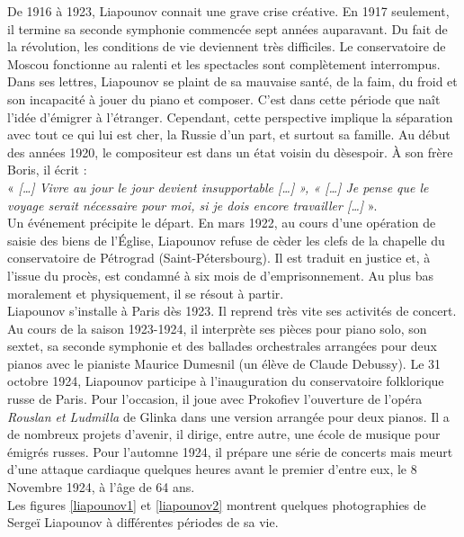 De 1916 à 1923, Liapounov connait une grave crise créative. En 1917 seulement, il termine sa seconde symphonie commencée sept années auparavant. Du fait de la révolution, les conditions de vie deviennent très difficiles. Le conservatoire de Moscou fonctionne au ralenti et les spectacles sont complètement interrompus. Dans ses lettres, Liapounov se plaint de sa mauvaise santé, de la faim, du froid et son incapacité à jouer du piano et composer. C'est dans cette période que naît l'idée d'émigrer à l'étranger. Cependant, cette perspective implique la séparation avec tout ce qui lui est cher, la Russie d'un part, et surtout sa famille. Au début des années 1920, le compositeur est dans un état voisin du dèsespoir. À son frère Boris, il écrit :\\
« \emph{[\dots] Vivre au jour le jour devient insupportable [\dots] », « [\dots] Je pense que le voyage serait nécessaire pour moi, si je dois encore travailler [\dots]} ».\\

Un événement précipite le départ. En mars 1922, au cours d'une opération de saisie des biens de l'Église, Liapounov refuse de cèder les clefs de la chapelle du conservatoire de Pétrograd (Saint-Pétersbourg). Il est traduit en justice et, à l'issue du procès, est condamné à six mois de d'emprisonnement. Au plus bas moralement et physiquement, il se résout à partir.\\

Liapounov s'installe à Paris dès 1923. Il reprend très vite ses activités de concert. Au cours de la saison 1923-1924, il interprète ses pièces pour piano solo, son sextet, sa seconde symphonie et des ballades orchestrales arrangées pour deux pianos avec le pianiste Maurice Dumesnil (un élève de Claude Debussy). Le 31 octobre 1924, Liapounov participe à l'inauguration du conservatoire folklorique russe de Paris. Pour l'occasion, il joue avec Prokofiev l'ouverture de l'opéra \emph{Rouslan et Ludmilla} de Glinka dans une version arrangée pour deux pianos. Il a de nombreux projets d'avenir, il dirige, entre autre, une école de musique pour émigrés russes. Pour l'automne 1924, il prépare une série de concerts mais meurt d'une attaque cardiaque quelques heures avant le premier d'entre eux, le 8 Novembre 1924, à l'âge de 64 ans.\\

Les figures \ref{liapounov1} et \ref{liapounov2} montrent quelques photographies de Sergeï Liapounov à différentes périodes de sa vie.

